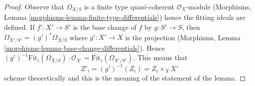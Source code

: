 \documentclass[10pt,a4paper]{amsart}
\theoremstyle{plain}
\theoremstyle{definition}
\theoremstyle{remark}
\numberwithin{equation}{subsection}
\begin{document}
\begin{proof}
Observe that $\Omega_{X/S}$ is a finite type quasi-coherent
$\mathcal{O}_X$-module
(Morphisms, Lemma \ref{morphisms-lemma-finite-type-differentials})
hence the fitting ideals are defined. If $f' : X' \to S'$
is the base change of $f$ by $g : S' \to S$, then
$\Omega_{X'/S'} = (g')^*\Omega_{X/S}$ where $g' : X' \to X$
is the projection
(Morphisms, Lemma \ref{morphisms-lemma-base-change-differentials}).
Hence $(g')^{-1}\text{Fit}_i(\Omega_{X/S}) \cdot \mathcal{O}_{X'} =
\text{Fit}_i(\Omega_{X'/S'})$. This means that
$$
Z'_i = (g')^{-1}(Z_i) = Z_i \times_X X'
$$
scheme theoretically and this is the meaning of the statement of
the lemma.
\end{proof}
\end{document}
